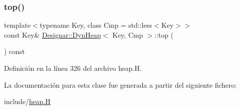 \subsubsection{\texorpdfstring{top()}{top()}}
{\footnotesize\ttfamily template$<$typename Key, class Cmp = std\+::less$<$\+Key$>$$>$ \\
const Key\& \hyperlink{class_designar_1_1_dyn_heap}{Designar\+::\+Dyn\+Heap}$<$ Key, Cmp $>$\+::top (\begin{DoxyParamCaption}{ }\end{DoxyParamCaption}) const\hspace{0.3cm}{\ttfamily [inline]}}



Definición en la línea 326 del archivo heap.\+H.



La documentación para esta clase fue generada a partir del siguiente fichero\+:\begin{DoxyCompactItemize}
\item 
include/\hyperlink{heap_8_h}{heap.\+H}\end{DoxyCompactItemize}
